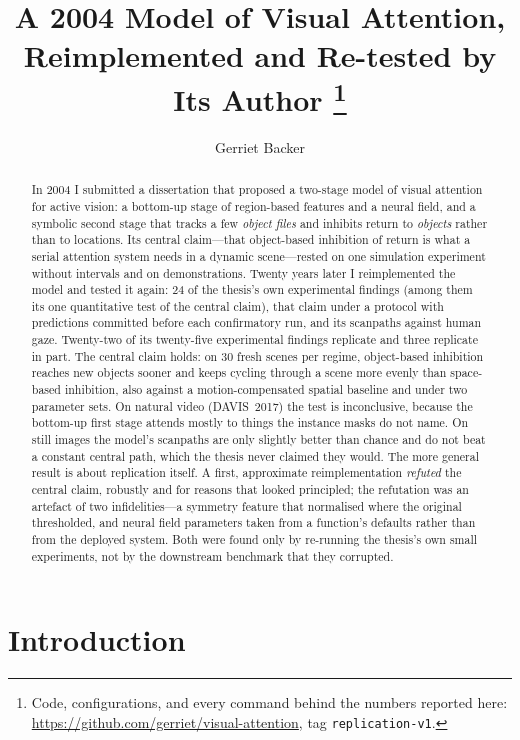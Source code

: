 \documentclass[11pt,a4paper]{article}
\title{A 2004 Model of Visual Attention, Reimplemented and Re-tested by Its Author%
\thanks{Code, configurations, and every command behind the numbers reported here:
\url{https://github.com/gerriet/visual-attention}, tag \texttt{replication-v1}.}}
\author{Gerriet Backer\\ \small\todo{affiliation / independent researcher; e-mail}}
\date{\todo{date}}
\begin{document}
\maketitle

\begin{abstract}
In 2004 I submitted a dissertation that proposed a two-stage model of visual
attention for active vision: a bottom-up stage of region-based features and a
neural field, and a symbolic second stage that tracks a few \emph{object files}
and inhibits return to \emph{objects} rather than to locations. Its central
claim---that object-based inhibition of return is what a serial attention system
needs in a dynamic scene---rested on one simulation experiment without
intervals and on demonstrations. Twenty years later I reimplemented the model and tested it again: 24 of the thesis's own
experimental findings (among them its one quantitative test of the central claim), that claim under a protocol with predictions
committed before each confirmatory run, and its scanpaths against human gaze.
Twenty-two of its twenty-five experimental findings replicate and three
replicate in part. The central claim holds:
on 30 fresh scenes per regime, object-based inhibition reaches new objects sooner
and keeps cycling through a scene more evenly than space-based inhibition, also
against a motion-compensated spatial baseline and under two parameter sets.
On natural video (DAVIS~2017) the test is inconclusive, because the bottom-up first stage attends mostly to things the instance masks do not name.
On still images the model's scanpaths are only slightly better than chance and
do not beat a constant central path, which the thesis never claimed they would.
The more general result is about replication itself. A first, approximate
reimplementation \emph{refuted} the central claim, robustly and for reasons that
looked principled; the refutation was an artefact of two infidelities---a
symmetry feature that normalised where the original thresholded, and neural
field parameters taken from a function's defaults rather than from the deployed
system. Both were found only by re-running the thesis's own small experiments,
not by the downstream benchmark that they corrupted.
\end{abstract}

\section{Introduction}
\label{sec:intro}
\end{document}
